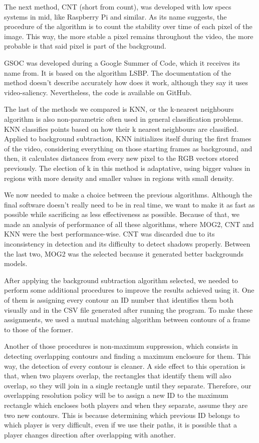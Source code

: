 The next method, CNT (short from count), was developed with low specs systems in mid, like Raspberry Pi and similar. As its name suggests, the procedure of the algorithm is to count the stability over time of each pixel of the image. This way, the more stable a pixel remains throughout the video, the more probable is that said pixel is part of the background.

GSOC was developed during a Google Summer of Code, which it receives its name from. It is based on the algorithm LSBP. The documentation of the method doesn’t describe accurately how does it work, although they say it uses video-saliency. Nevertheless, the code is available on GitHub.

The last of the methods we compared is KNN, or the k-nearest neighbours algorithm is also non-parametric often used in general classification problems. KNN classifies points based on how their k nearest neighbours are classified. Applied to background subtraction, KNN initializes itself during the first frames of the video, considering everything on those starting frames as background, and then, it calculates distances from every new pixel to the RGB vectors stored previously. The election of k in this method is adaptative, using bigger values in regions with more density and smaller values in regions with small density.

We now needed to make a choice between the previous algorithms. Although the final software doesn’t really need to be in real time, we want to make it as fast as possible while sacrificing as less effectiveness as possible. Because of that, we made an analysis of performance of all these algorithms, where MOG2, CNT and KNN were the best performance-wise. CNT was discarded due to its inconsistency in detection and its difficulty to detect shadows properly. Between the last two, MOG2 was the selected because it generated better backgrounds models. 

After applying the background subtraction algorithm selected, we needed to perform some additional procedures to improve the results achieved using it. One of them is assigning every contour an ID number that identifies them both visually and in the CSV file generated after running the program. To make these assignments, we used a mutual matching algorithm between contours of a frame to those of the former.

Another of those procedures is non-maximum suppression, which consists in detecting overlapping contours and finding a maximum enclosure for them. This way, the detection of every contour is cleaner. A side effect to this operation is that, when two players overlap, the rectangles that identify them will also overlap, so they will join in a single rectangle until they separate. Therefore, our overlapping resolution policy will be to assign a new ID to the maximum rectangle which encloses both players and when they separate, assume they are two new contours. This is because determining which previous ID belongs to which player is very difficult, even if we use their paths, it is possible that a player changes direction after overlapping with another.

